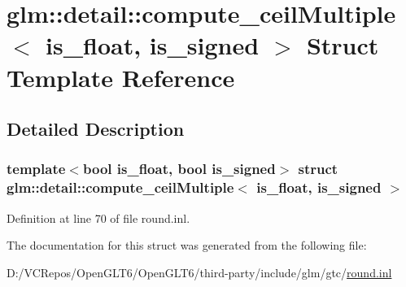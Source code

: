 \hypertarget{structglm_1_1detail_1_1compute__ceil_multiple}{}\section{glm\+::detail\+::compute\+\_\+ceil\+Multiple$<$ is\+\_\+float, is\+\_\+signed $>$ Struct Template Reference}
\label{structglm_1_1detail_1_1compute__ceil_multiple}


\subsection{Detailed Description}
\subsubsection*{template$<$bool is\+\_\+float, bool is\+\_\+signed$>$\newline
struct glm\+::detail\+::compute\+\_\+ceil\+Multiple$<$ is\+\_\+float, is\+\_\+signed $>$}



Definition at line 70 of file round.\+inl.



The documentation for this struct was generated from the following file\+:\begin{DoxyCompactItemize}
\item 
D\+:/\+V\+C\+Repos/\+Open\+G\+L\+T6/\+Open\+G\+L\+T6/third-\/party/include/glm/gtc/\mbox{\hyperlink{round_8inl}{round.\+inl}}\end{DoxyCompactItemize}
